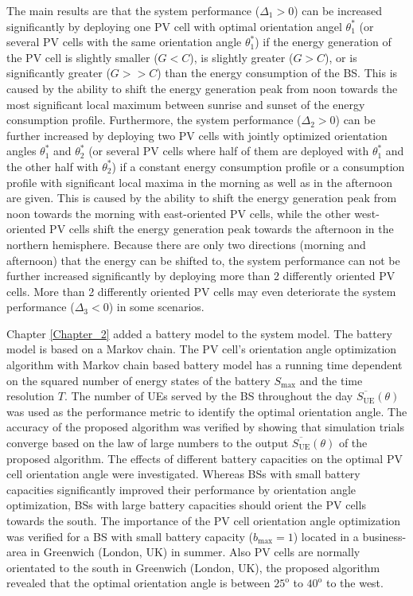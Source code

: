 The main results are that the system performance ($\Delta_1 > 0$) can be increased significantly by deploying one PV cell with optimal orientation angel $\theta_1^*$ (or several PV cells with the same orientation angle $\theta_1^*$) if the energy generation of the PV cell is slightly smaller ($G<C$), is slightly greater ($G>C$), or is significantly greater ($G>>C$) than the energy consumption of the BS. This is caused by the ability to shift the energy generation peak from noon towards the most significant local maximum between sunrise and sunset of the energy consumption profile. 
Furthermore, the system performance ($\Delta_2 > 0$) can be further increased by deploying two PV cells with jointly optimized orientation angles $\theta_1^*$ and $\theta_2^*$ (or several PV cells where half of them are deployed with $\theta_1^*$ and the other half with $\theta_2^*$) if a constant energy consumption profile or a consumption profile with significant local maxima in the morning as well as in the afternoon are given. This is caused by the ability to shift the energy generation peak from noon towards the morning with east-oriented PV cells, while the other west-oriented PV cells shift the energy generation peak towards the afternoon in the northern hemisphere. Because there are only two directions (morning and afternoon) that the energy can be shifted to, the system performance can not be further increased significantly by deploying more than 2 differently oriented PV cells. More than 2 differently oriented PV cells may even deteriorate the system performance ($\Delta_3 < 0$) in some scenarios.

Chapter \ref{Chapter_2} added a battery model to the system model. The battery model is based on a Markov chain. The PV cell's orientation angle optimization algorithm with Markov chain based battery model has a running time dependent on the squared number of energy states of the battery $S_{\max}$ and the time resolution $T$. The number of UEs served by the BS throughout the day $\overline{S_{\mathrm{UE}}}(\theta)$ was used as the performance metric to identify the optimal orientation angle. The accuracy of the proposed algorithm was verified by showing that simulation trials converge based on the law of large numbers to the output $\overline{S_{\mathrm{UE}}}(\theta)$ of the proposed algorithm. 
The effects of different battery capacities on the optimal PV cell orientation angle were investigated. 
Whereas BSs with small battery capacities significantly improved their performance by orientation angle optimization, BSs with large battery capacities should orient the PV cells towards the south. The importance of the PV cell orientation angle optimization was verified for a BS with small battery capacity ($b_{\max}=1$) located in a business-area in Greenwich (London, UK) in summer. Also PV cells are normally orientated to the south in Greenwich (London, UK), the proposed algorithm revealed that the optimal orientation angle is between $25^{\mathrm{o}}$ to $40 ^{\mathrm{o}}$ to the west. 





